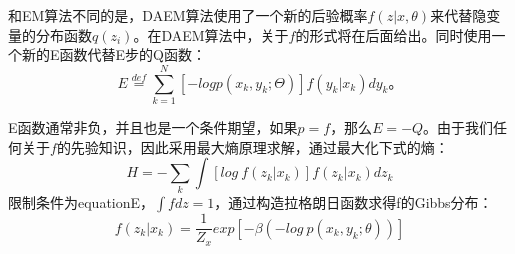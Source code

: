 \documentclass[a4paper,12pt,openany,oneside,utf-8]{ctexbook}
\begin{document}
    和EM算法不同的是，DAEM算法使用了一个新的后验概率$f(z|x,\theta)$来代替隐变量的分布函数$q(z_i)$。在DAEM算法中，关于$f$的形式将在后面给出。同时使用一个新的E函数代替E步的Q函数：
    \begin{equation}\label{eq1}
        E\overset{def}{=}\sum_{k=1}^{N}[-logp(x_k,y_k;\Theta)]f(y_k|x_k)dy_k。
    \end{equation}
    
    E函数通常非负，并且也是一个条件期望，如果$p=f$，那么$E=-Q$。由于我们任何关于$f$的先验知识，因此采用最大熵原理求解，通过最大化下式的熵：
    \begin{equation}\label{eq2}
        H=-\sum_k\int[log\ f(z_k|x_k)]f(z_k|x_k)dz_k
    \end{equation}
    限制条件为equationE，$\int f dz=1$，通过构造拉格朗日函数求得f的Gibbs分布：
    \begin{equation}\label{eq3}
        f(z_k|x_k)=\frac{1}{Z_x}exp[-\beta(-log\ p(x_k,y_k;\theta))]
    \end{equation}
    
\end{document}
